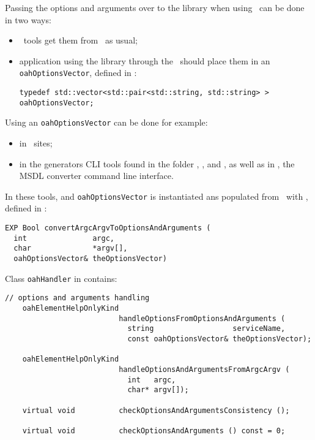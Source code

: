 Passing the options and arguments over to the library when using \mf\ can be done in two ways:
\begin{itemize}
\item \CLI\ tools get them from \argcargv\ as usual;
\item application using the library through the \API\ should place them in an {\tt oahOptionsVector}, defined in :
\begin{lstlisting}[language=CPlusPlus]
typedef std::vector<std::pair<std::string, std::string> > oahOptionsVector;
\end{lstlisting}

\end{itemize}

Using an {\tt oahOptionsVector} can be done for example:
\begin{itemize}
\item in \Web\ sites; %
\item in the generators CLI tools found in the \clisamples{} folder , ,  and , as well as in , the MSDL converter command line interface.
\end{itemize}

 In these tools, and {\tt oahOptionsVector} is instantiated ans populated from \argcargv\ with , defined in :%
\begin{lstlisting}[language=CPlusPlus]
EXP Bool convertArgcArgvToOptionsAndArguments (
  int               argc,
  char              *argv[],
  oahOptionsVector& theOptionsVector)
\end{lstlisting}

Class {\tt oahHandler} in  contains:
\begin{lstlisting}[language=CPlusPlus]
    // options and arguments handling
    oahElementHelpOnlyKind
                          handleOptionsFromOptionsAndArguments (
                            string                  serviceName,
                            const oahOptionsVector& theOptionsVector);

    oahElementHelpOnlyKind
                          handleOptionsAndArgumentsFromArgcArgv (
                            int   argc,
                            char* argv[]);

    virtual void          checkOptionsAndArgumentsConsistency ();

    virtual void          checkOptionsAndArguments () const = 0;
\end{lstlisting}


